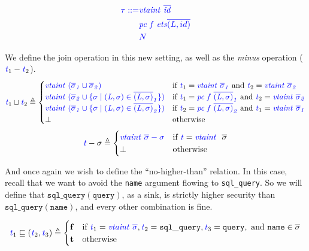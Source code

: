\documentclass{llncs}
\begin{document}
\[  \color{blue}
\begin{aligned}
  \tau ::= & \mathit{\color{blue} vtaint ~ \overline{id}} \\
  & \mathit{\color{blue} pc ~ f ~ ets}{\overline{(L,id)}} \\
  & {\color{blue} N} \\
\end{aligned}\]

We define the join operation in this new setting, as well as the {\em minus} operation (\(\mathit{\color{blue} t}_1 - \mathit{\color{blue} t}_2\)).
%
\[\mathit{\color{blue} t}_1 \sqcup \mathit{\color{blue} t}_2 \triangleq
\begin{cases}
  \mathit{\color{blue} vtaint ~ (\overline{\sigma}_1 \cup \overline{\sigma}_2)} &
  \textnormal{if } \mathit{\color{blue} t}_1 = \mathit{\color{blue} vtaint ~ \overline{\sigma}_1} \textnormal{ and }
  \mathit{\color{blue} t}_2 = \mathit{\color{blue} vtaint ~ \overline{\sigma}_2}\\
  \mathit{\color{blue} vtaint ~ (\overline{\sigma}_2 \cup \{\sigma \mid (L,\sigma) \in \overline{(L,\sigma)}_1\})} &
  \textnormal{if } \mathit{\color{blue} t}_1 = \mathit{\color{blue} pc ~ f ~ \overline{(L,\sigma)}_1} \textnormal{ and }
  \mathit{\color{blue} t}_2 = \mathit{\color{blue} vtaint ~ \overline{\sigma}_2}\\
  \mathit{\color{blue} vtaint ~ (\overline{\sigma}_1 \cup \{\sigma \mid (L,\sigma) \in \overline{(L,\sigma)}_2\})} &
  \textnormal{if } \mathit{\color{blue} t}_2 = \mathit{\color{blue} pc ~ f ~ \overline{(L,\sigma)}_2} \textnormal{ and }
  \mathit{\color{blue} t}_1 = \mathit{\color{blue} vtaint ~ \overline{\sigma}_1}\\
  \bot & \textnormal{otherwise} \\
\end{cases}\]
%
\[\mathit{\color{blue} t} - \sigma \triangleq
\begin{cases}
  \mathit{\color{blue} vtaint ~ \overline{\sigma} - \sigma} &
  \textnormal{if } \mathit{\color{blue} t} = \mathit{\color{blue} vtaint ~ ~} \overline{\sigma} \\
  \bot & \textnormal{otherwise} \\
\end{cases}\]

And once again we wish to define the ``no-higher-than'' relation. In this case,
recall that we want to avoid the {\tt name} argument flowing to {\tt sql\_query}.
So we will define that \(\mathtt{sql\_query(query)}\), as a sink, is strictly
higher security than \(\mathtt{sql\_query(name)}\), and every other combination is fine.

\[\mathit{\color{blue} t}_1 \sqsubseteq (\mathit{\color{blue} t}_2,\mathit{\color{blue} t}_3) \triangleq
\begin{cases}
  \mathbf{f} & \textnormal{if } \mathit{\color{blue} t}_1 = \mathit{\color{blue} vtaint ~ \overline{\sigma}},
  \mathit{\color{blue} t}_2 = \mathtt{sql\_query}, \mathit{\color{blue} t}_3 = \mathtt{query}, \textnormal{ and }
  \mathtt{name} \in \overline{\sigma} \\
  \mathbf{t} & \textnormal{otherwise} \\
\end{cases}\]
\end{document}
